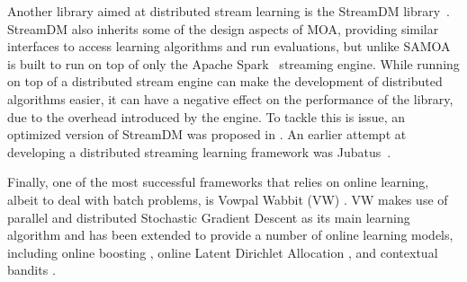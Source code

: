Another library aimed at distributed stream learning is the StreamDM library~\cite{streamdm}.
StreamDM also inherits some of the design aspects of MOA, providing similar interfaces
to access learning algorithms and run evaluations, but unlike SAMOA
is built to run on top of only the Apache Spark~\cite{spark} streaming engine.
While running on top of a distributed stream engine can make the development
of distributed algorithms easier, it can have a negative effect on the
performance of the library, due to the overhead introduced by the
engine. To tackle this is issue, an optimized version of StreamDM
was proposed in \cite{streamdmPP}. An earlier attempt at developing
a distributed streaming learning framework was Jubatus~\cite{jubatus}.

Finally, one of the most successful frameworks that relies on online learning,
albeit to deal with batch problems, is Vowpal Wabbit (VW) \cite{vw}. VW makes
use of parallel and distributed Stochastic Gradient Descent \cite{sgd} as its main
learning algorithm and has been extended to provide a number of online learning models,
including online boosting \cite{Beygelzimer2015optimal}, online Latent Dirichlet Allocation
\cite{ldaOnline}, and contextual bandits \cite{onlineBandits}.
